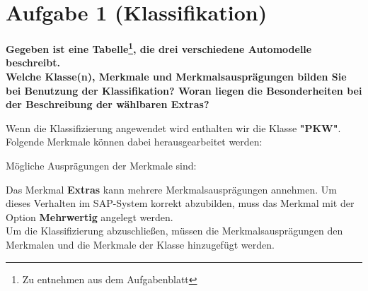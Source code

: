 \section{Aufgabe 1 (Klassifikation)}
\label{sec:Aufgabe 1 (Klassifikation)}
\textbf{Gegeben ist eine Tabelle\footnote{Zu entnehmen aus dem Aufgabenblatt},
die drei verschiedene Automodelle beschreibt. \\[1ex]
Welche Klasse(n), Merkmale und Merkmalsausprägungen bilden Sie bei Benutzung
der Klassifikation? Woran liegen die Besonderheiten bei der Beschreibung der
wählbaren Extras?}

Wenn die Klassifizierung angewendet wird enthalten wir die Klasse
\textbf{"PKW"}. Folgende Merkmale können dabei herausgearbeitet werden:


Mögliche Ausprägungen der Merkmale sind:

Das Merkmal \textbf{Extras} kann mehrere Merkmalsausprägungen annehmen. Um
dieses Verhalten im SAP-System korrekt abzubilden, muss das Merkmal
mit der Option \textbf{Mehrwertig} angelegt werden.\\

Um die Klassifizierung abzuschließen, müssen die Merkmalsausprägungen den
Merkmalen und die Merkmale der Klasse hinzugefügt werden.
